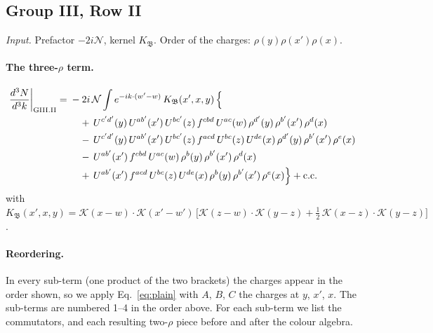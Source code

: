 \documentclass[10pt]{article}
\numberwithin{equation}{section}
\newcommand{\KK}{\mathcal K}
\newcommand{\NN}{\mathcal N}
\begin{document}
\subsection{Group III, Row II}\label{sec:GIII.II}
\emph{Input.} Prefactor $-2i\NN$, kernel $K_{\mathfrak B}$. Order of the charges: $\rho(y)\rho(x')\rho(x)$.
\paragraph{The three-$\rho$ term.}
\begin{align}
\frac{d^3N}{d^3k}\bigg|_{\rm GIII.II}={}&-2i\,\NN\int e^{-ik\cdot(w'-w)}\,K_{\mathfrak B}(x',x,y)\,\Big\{\notag\\
&\quad +\,U^{c'd'}(y)\,U^{ab'}(x')\,U^{bc'}(z)\,f^{cbd}\,U^{ac}(w)\,\rho^{d'}(y)\,\rho^{b'}(x')\,\rho^{d}(x)\notag\\
&\quad -\,U^{c'd'}(y)\,U^{ab'}(x')\,U^{bc'}(z)\,f^{acd}\,U^{bc}(z)\,U^{de}(x)\,\rho^{d'}(y)\,\rho^{b'}(x')\,\rho^{e}(x)\notag\\
&\quad -\,U^{ab'}(x')\,f^{cbd}\,U^{ac}(w)\,\rho^{b}(y)\,\rho^{b'}(x')\,\rho^{d}(x)\notag\\
&\quad +\,U^{ab'}(x')\,f^{acd}\,U^{bc}(z)\,U^{de}(x)\,\rho^{b}(y)\,\rho^{b'}(x')\,\rho^{e}(x)\Big\}+{\rm c.c.}\label{eq:in-GIII.II}
\end{align}
with $K_{\mathfrak B}(x',x,y)=\KK(x-w)\cdot\KK(x'-w')\,\Big[\KK(z-w)\cdot\KK(y-z)+\tfrac12\,\KK(x-z)\cdot\KK(y-z)\Big]$.
\paragraph{Reordering.} In every sub-term (one product of the two brackets) the charges appear in the order shown, so we apply Eq.~\eqref{eq:plain} with $A$, $B$, $C$ the charges at $y$, $x'$, $x$. The sub-terms are numbered 1--4 in the order above. For each sub-term we list the commutators, and each resulting two-$\rho$ piece before and after the colour algebra.
\end{document}
